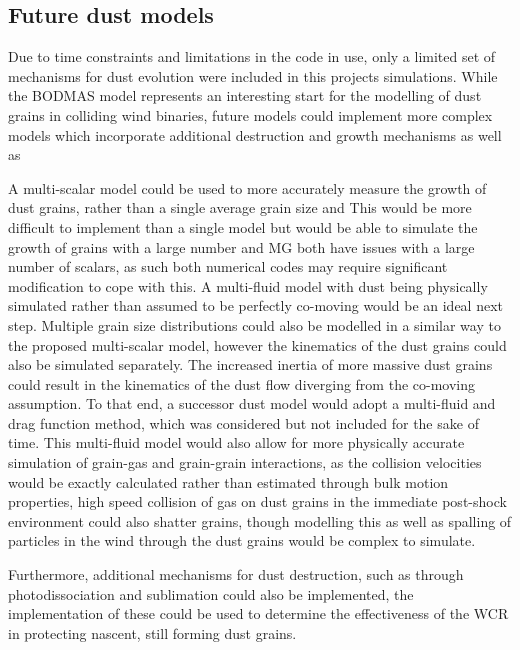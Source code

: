 \subsection{Future dust models}


Due to time constraints and limitations in the code in use, only a limited set of mechanisms for dust evolution were included in this projects simulations.
While the BODMAS model represents an interesting start for the modelling of dust grains in colliding wind binaries, future models could implement more complex models which incorporate additional destruction and growth mechanisms as well as 

A multi-scalar model could be used to more accurately measure the growth of dust grains, rather than a single average grain size and 
This would be more difficult to implement than a single model but would be able to simulate the growth of grains with a large number 
\athena{} and MG both have issues with a large number of scalars, as such both numerical codes may require significant modification to cope with this.
A multi-fluid model with dust being physically simulated rather than assumed to be perfectly co-moving would be an ideal next step.
Multiple grain size distributions could also be modelled in a similar way to the proposed multi-scalar model, however the kinematics of the dust grains could also be simulated separately.
The increased inertia of more massive dust grains could result in the kinematics of the dust flow diverging from the co-moving assumption.
To that end, a successor dust model would adopt a multi-fluid and drag function method, which was considered but not included for the sake of time.
This multi-fluid model would also allow for more physically accurate simulation of grain-gas and grain-grain interactions, as the collision velocities would be exactly calculated rather than estimated through bulk motion properties, high speed collision of gas on dust grains in the immediate post-shock environment could also shatter grains, though modelling this as well as spalling of particles in the wind through the dust grains would be complex to simulate. 

Furthermore, additional mechanisms for dust destruction, such as through photodissociation and sublimation could also be implemented, the implementation of these could be used to determine the effectiveness of the WCR in protecting nascent, still forming dust grains.


